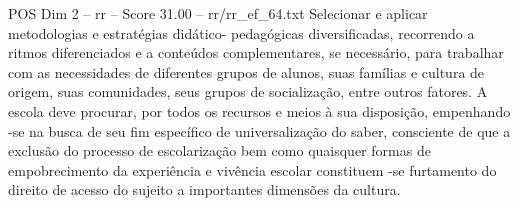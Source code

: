 \begin{textsample}{POS Dim 2 – rr – Score 31.00 – rr/rr\_ef\_64.txt}
Selecionar e aplicar metodologias e estratégias didático- pedagógicas diversificadas, recorrendo a ritmos diferenciados e a conteúdos complementares, se necessário, para trabalhar com as necessidades de diferentes grupos de alunos, suas famílias e cultura de origem, suas comunidades, seus grupos de socialização, entre outros fatores.
A escola deve procurar, por todos os recursos e meios à sua disposição, empenhando -se na busca de seu fim específico de universalização do saber, consciente de que a exclusão do processo de escolarização bem como quaisquer formas de empobrecimento da experiência e vivência escolar constituem -se furtamento do direito de acesso do sujeito a importantes dimensões da cultura.

\end{textsample}
